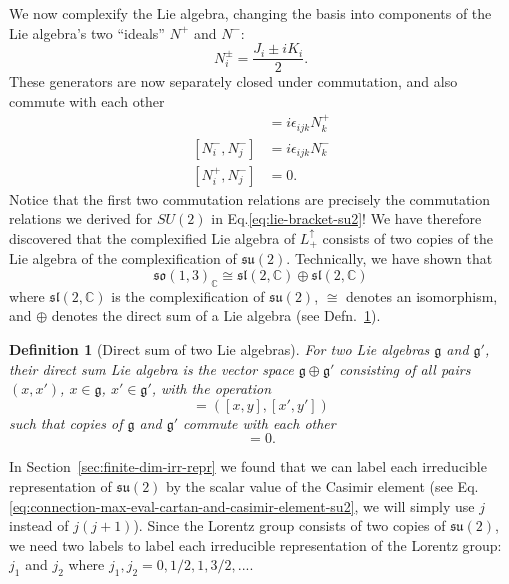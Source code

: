 \documentclass[11pt]{article}
\numberwithin{equation}{section}
\newtheorem{defn}{Definition}[section]
\begin{document}
We now complexify the Lie algebra, changing the basis into components of the Lie algebra's two ``ideals'' $N^+$ and $N^-$:
\begin{equation}
N_i^\pm = \frac{J_i \pm i K_i}{2}. \label{eq:complexification-lie-algebra-lorentz-group}
\end{equation}
These generators are now separately closed under commutation, and also commute with each other
\begin{align}
[N_i^+, N_j^+] &= i \epsilon_{ijk} N_k^+ \\
[N_i^-, N_j^-] &= i \epsilon_{ijk} N_k^- \\
[N_i^+, N_j^-] &= 0. 
\end{align}
Notice that the first two commutation relations are precisely the commutation relations we derived for $SU(2)$ in Eq.\eqref{eq:lie-bracket-su2}! We have therefore discovered that the complexified Lie algebra of $L^\uparrow_+$ consists of two copies of the Lie algebra of the complexification of $\mathfrak{su}(2)$. Technically, we have shown that
\begin{equation}
\mathfrak{so}(1,3)_\mathbb{C}  \cong \mathfrak{sl}(2, \mathbb{C}) \oplus \mathfrak{sl}(2, \mathbb{C})
\end{equation}
where $\mathfrak{sl}(2, \mathbb{C})$ is the complexification of $\mathfrak{su}(2)$, $\cong$ denotes an isomorphism, and $\oplus$ denotes the direct sum of a Lie algebra (see Defn.~\ref{defn:direct-sum-lie-algebra}).

\begin{defn}[Direct sum of two Lie algebras] \label{defn:direct-sum-lie-algebra}
For two Lie algebras $\mathfrak{g}$ and $\mathfrak{g}'$, their direct sum Lie algebra is the vector space $\mathfrak{g} \oplus \mathfrak{g}'$ consisting of all pairs $(x, x')$, $x \in \mathfrak{g}$, $x' \in \mathfrak{g'}$, with the operation
\begin{equation}
[(x, x'), (y, y')] = ([x,y], [x',y'])
\end{equation}
such that copies of $\mathfrak{g}$ and $\mathfrak{g}'$ commute with each other
\begin{equation}
[(x,0),(0,x')] = 0. 
\end{equation}
\end{defn}

In Section~\ref{sec:finite-dim-irr-repr} we found that we can label each irreducible representation of $\mathfrak{su}(2)$ by the scalar value of the Casimir element (see Eq.\eqref{eq:connection-max-eval-cartan-and-casimir-element-su2}, we will simply use $j$ instead of $j(j+1)$). Since the Lorentz group consists of two copies of $\mathfrak{su}(2)$, we need two labels to label each irreducible representation of the Lorentz group: $j_1$ and $j_2$ where $j_1, j_2 = 0, 1/2, 1, 3/2, ...$.
\end{document}
